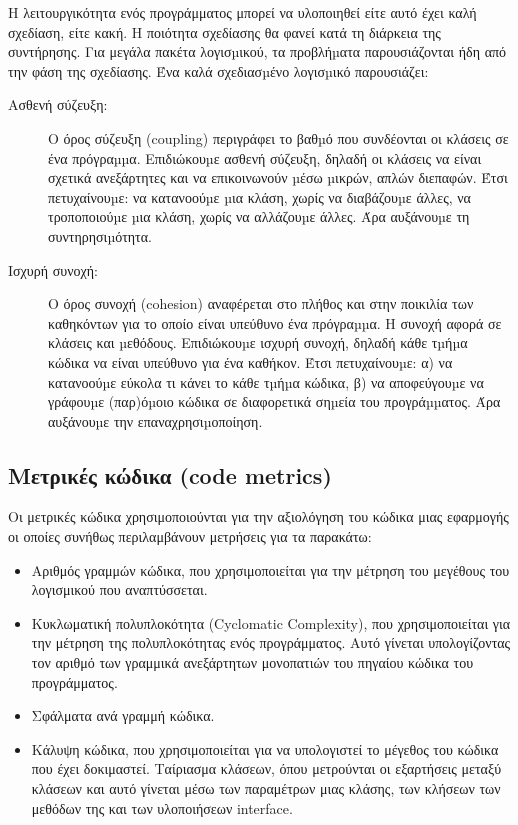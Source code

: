 Η λειτουργικότητα ενός προγράμματος μπορεί να υλοποιηθεί είτε αυτό έχει καλή σχεδίαση, είτε κακή. Η ποιότητα σχεδίασης θα φανεί κατά τη διάρκεια της συντήρησης. Για μεγάλα πακέτα λογισµικού, τα προβλήµατα παρουσιάζονται ήδη από την φάση της σχεδίασης.  Ένα καλά σχεδιασµένο λογισµικό παρουσιάζει:
\begin{description}
\item[Aσθενή σύζευξη:] Ο όρος σύζευξη (coupling) περιγράφει το βαθµό που συνδέονται οι κλάσεις σε ένα πρόγραµµα. Επιδιώκουµε ασθενή σύζευξη, δηλαδή οι κλάσεις να είναι σχετικά ανεξάρτητες και να επικοινωνούν µέσω µικρών, απλών διεπαφών. Έτσι πετυχαίνουµε: να κατανοούµε µια κλάση, χωρίς να διαβάζουµε άλλες, να τροποποιούµε µια κλάση, χωρίς να αλλάζουµε άλλες.  Άρα αυξάνουµε τη συντηρησιµότητα.
\item[Ισχυρή συνοχή:] Ο όρος συνοχή (cohesion) αναφέρεται στο πλήθος και στην ποικιλία των καθηκόντων για το οποίο είναι υπεύθυνο ένα πρόγραµµα.  Η συνοχή αφορά σε κλάσεις και µεθόδους. Επιδιώκουµε ισχυρή συνοχή, δηλαδή κάθε τµήµα κώδικα να είναι υπεύθυνο για ένα καθήκον. Έτσι πετυχαίνουµε: α) να κατανοούµε εύκολα τι κάνει το κάθε τµήµα κώδικα, β) να αποφεύγουµε να γράφουµε (παρ)όµοιο κώδικα σε διαφορετικά σηµεία του προγράµµατος.  Άρα αυξάνουµε την επαναχρησιµοποίηση.
\end{description}

\subsection{Μετρικές κώδικα (code metrics)}

Οι μετρικές κώδικα χρησιμοποιούνται για την αξιολόγηση του κώδικα μιας εφαρμογής οι οποίες συνήθως περιλαμβάνουν μετρήσεις για τα παρακάτω:
\begin{itemize}
\item Αριθμός γραμμών κώδικα, που χρησιμοποιείται για την μέτρηση του μεγέθους του λογισμικού που αναπτύσσεται.
\item Κυκλωματική πολυπλοκότητα (Cyclomatic Complexity), που χρησιμοποιείται για την μέτρηση της πολυπλοκότητας ενός προγράμματος. Αυτό γίνεται υπολογίζοντας τον αριθμό των γραμμικά ανεξάρτητων μονοπατιών του πηγαίου κώδικα του προγράμματος.
\item Σφάλματα ανά γραμμή κώδικα.
\item Κάλυψη κώδικα, που χρησιμοποιείται για να υπολογιστεί το μέγεθος του κώδικα που έχει δοκιμαστεί.
Ταίριασμα κλάσεων, όπου μετρούνται οι εξαρτήσεις μεταξύ κλάσεων και αυτό γίνεται μέσω των παραμέτρων μιας κλάσης, των κλήσεων των μεθόδων της και των υλοποιήσεων interface.
\end{itemize}
